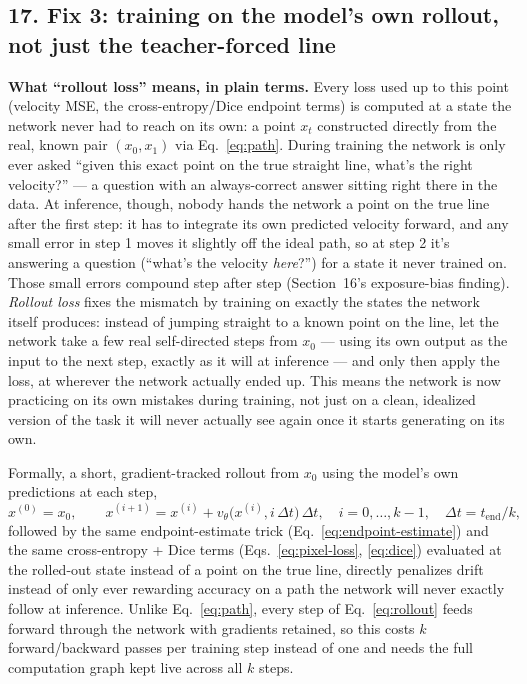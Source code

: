 \documentclass[11pt]{article}
\newcommand{\hsub}[1]{\subsection*{#1}}
\begin{document}
\hsub{17. Fix 3: training on the model's own rollout, not just the teacher-forced line}
\textbf{What ``rollout loss'' means, in plain terms.} Every loss used up to this point
(velocity MSE, the cross-entropy/Dice endpoint terms) is computed at a state the network never
had to reach on its own: a point $x_t$ constructed directly from the real, known pair
$(x_0, x_1)$ via Eq.~\eqref{eq:path}. During training the network is only ever asked ``given
this exact point on the true straight line, what's the right velocity?'' --- a question with
an always-correct answer sitting right there in the data. At inference, though, nobody hands
the network a point on the true line after the first step: it has to integrate its own
predicted velocity forward, and any small error in step 1 moves it slightly off the ideal
path, so at step 2 it's answering a question (``what's the velocity \emph{here}?'') for a state
it never trained on. Those small errors compound step after step (Section~16's exposure-bias
finding). \emph{Rollout loss} fixes the mismatch by training on exactly the states the network
itself produces: instead of jumping straight to a known point on the line, let the network take
a few real self-directed steps from $x_0$ --- using its own output as the input to the next
step, exactly as it will at inference --- and only then apply the loss, at wherever the network
actually ended up. This means the network is now practicing on its own mistakes during
training, not just on a clean, idealized version of the task it will never actually see again
once it starts generating on its own.

Formally, a short, gradient-tracked rollout from $x_0$ using the model's own predictions at
each step,
\begin{equation}
x^{(0)} = x_0, \qquad x^{(i+1)} = x^{(i)} + v_\theta\big(x^{(i)}, i\,\Delta t\big)\,\Delta t,
\quad i = 0,\dots,k-1, \quad \Delta t = t_{\text{end}}/k, \label{eq:rollout}
\end{equation}
followed by the same endpoint-estimate trick (Eq.~\eqref{eq:endpoint-estimate}) and the same
cross-entropy + Dice terms (Eqs.~\ref{eq:pixel-loss}, \ref{eq:dice}) evaluated at the rolled-out
state instead of a point on the true line, directly penalizes drift instead of only ever
rewarding accuracy on a path the network will never exactly follow at inference. Unlike
Eq.~\eqref{eq:path}, every step of Eq.~\eqref{eq:rollout} feeds forward through the network with
gradients retained, so this costs $k$ forward/backward passes per training step instead of one
and needs the full computation graph kept live across all $k$ steps.
\end{document}
